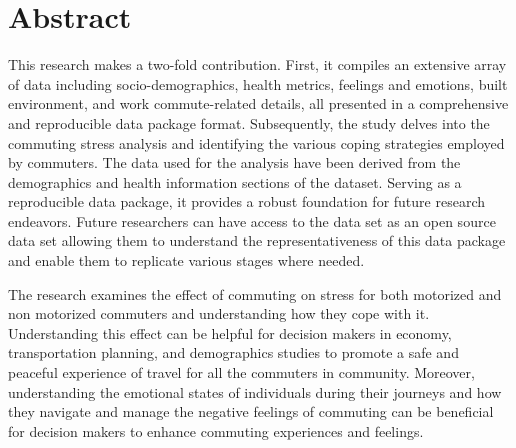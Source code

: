 \documentclass[
11pt, %
oneside, %
english, %
singlespacing, %
]{macthesis} %
\begin{document}

\section*{Abstract}
\addchaptertocentry{\abstractname}
This research makes a two-fold contribution. First, it compiles an extensive array of data including socio-demographics, health metrics, feelings and emotions, built environment, and work commute-related details, all presented in a comprehensive and reproducible data package format. Subsequently, the study delves into the commuting stress analysis and identifying the various coping strategies employed by commuters. The data used for the analysis have been derived from the demographics and health information sections of the dataset. Serving as a reproducible data package, it provides a robust foundation for future research endeavors. Future researchers can have access to the data set as an open source data set allowing them to understand the representativeness of this data package and enable them to replicate various stages where needed.

The research examines the effect of commuting on stress for both motorized and non motorized commuters and understanding how they cope with it. Understanding this effect can be helpful for decision makers in economy, transportation planning, and demographics studies to promote a safe and peaceful experience of travel for all the commuters in community. Moreover, understanding the emotional states of individuals during their journeys and how they navigate and manage the negative feelings of commuting can be beneficial for decision makers to enhance commuting experiences and feelings.
\end{document}
